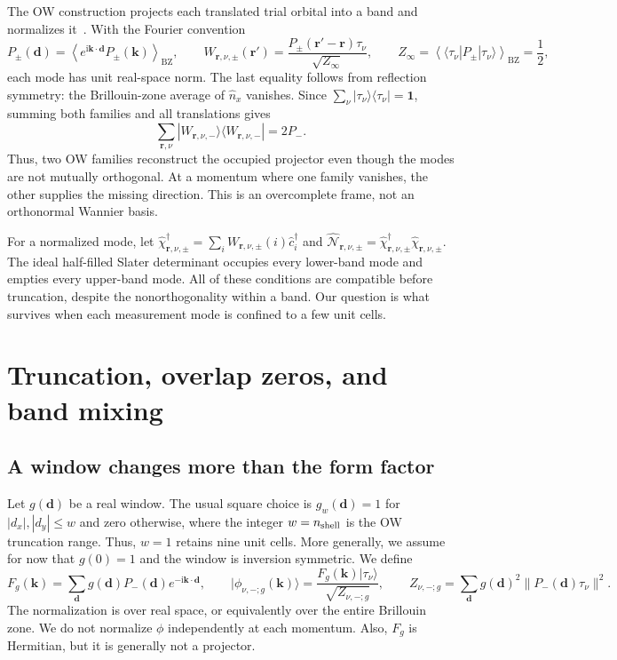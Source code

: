 \documentclass[aps,prb,onecolumn,nofootinbib,superscriptaddress]{revtex4-2}
\newcommand{\bk}{\boldsymbol{k}}
\newcommand{\bd}{\boldsymbol{d}}
\newcommand{\br}{\boldsymbol{r}}
\newcommand{\Id}{\mathbf{1}}
\newcommand{\ii}{\mathrm{i}}
\newcommand{\BZ}{\mathrm{BZ}}
\newcommand{\avg}[1]{\left\langle #1\right\rangle_{\BZ}}
\begin{document}
The OW construction projects each translated trial orbital into a band and normalizes it~\cite{BPJ,Li2024}. With the Fourier convention
\begin{equation}
 P_\pm(\bd)=\avg{e^{\ii\bk\cdot\bd}P_\pm(\bk)},
 \qquad
 W_{\br,\nu,\pm}(\br')=\frac{P_\pm(\br'-\br)\tau_\nu}{\sqrt{Z_\infty}},
 \qquad Z_\infty=\avg{\langle\tau_\nu|P_\pm|\tau_\nu\rangle}=\frac12,
 \label{eq:ow}
\end{equation}
each mode has unit real-space norm. The last equality follows from reflection symmetry: the Brillouin-zone average of $\widehat n_x$ vanishes. Since $\sum_\nu|\tau_\nu\rangle\langle\tau_\nu|=\Id$, summing both families and all translations gives
\begin{equation}
 \sum_{\br,\nu}|W_{\br,\nu,-}\rangle\langle W_{\br,\nu,-}|=2P_-.
 \label{eq:tight}
\end{equation}
Thus, two OW families reconstruct the occupied projector even though the modes are not mutually orthogonal. At a momentum where one family vanishes, the other supplies the missing direction. This is an overcomplete frame, not an orthonormal Wannier basis.

For a normalized mode, let $\hat\chi^\dagger_{\br,\nu,\pm}=\sum_i W_{\br,\nu,\pm}(i)\hat c_i^\dagger$ and $\hat{\mathcal N}_{\br,\nu,\pm}=\hat\chi^\dagger_{\br,\nu,\pm}\hat\chi_{\br,\nu,\pm}$. The ideal half-filled Slater determinant occupies every lower-band mode and empties every upper-band mode. All of these conditions are compatible before truncation, despite the nonorthogonality within a band. Our question is what survives when each measurement mode is confined to a few unit cells.

\section{Truncation, overlap zeros, and band mixing}

\subsection{A window changes more than the form factor}

Let $g(\bd)$ be a real window. The usual square choice is $g_w(\bd)=1$ for $|d_x|,|d_y|\le w$ and zero otherwise, where the integer $w=n_{\rm shell}$ is the OW truncation range. Thus, $w=1$ retains nine unit cells. More generally, we assume for now that $g(0)=1$ and the window is inversion symmetric. We define
\begin{equation}
 F_g(\bk)=\sum_{\bd}g(\bd)P_-(\bd)e^{-\ii\bk\cdot\bd},
 \qquad
 |\phi_{\nu,-;g}(\bk)\rangle=\frac{F_g(\bk)|\tau_\nu\rangle}{\sqrt{Z_{\nu,-;g}}},
 \qquad
 Z_{\nu,-;g}=\sum_{\bd}g(\bd)^2\|P_-(\bd)\tau_\nu\|^2.
 \label{eq:window}
\end{equation}
The normalization is over real space, or equivalently over the entire Brillouin zone. We do not normalize $\phi$ independently at each momentum. Also, $F_g$ is Hermitian, but it is generally not a projector.
\end{document}
